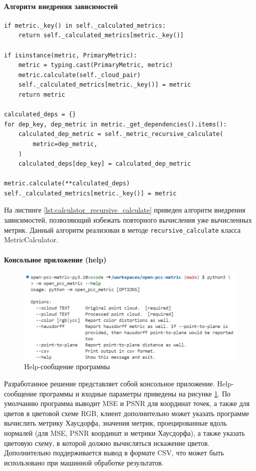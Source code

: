 \documentclass[a4paper,12pt]{extreport}
\begin{document}
\paragraph{Алгоритм внедрения зависимостей}

\begin{lstlisting}[caption={
    Алгоритм подсчёта метрик.
}, label={lst:calculator_recursive_calculate}]
if metric._key() in self._calculated_metrics:
    return self._calculated_metrics[metric._key()]

if isinstance(metric, PrimaryMetric):
    metric = typing.cast(PrimaryMetric, metric)
    metric.calculate(self._cloud_pair)
    self._calculated_metrics[metric._key()] = metric
    return metric

calculated_deps = {}
for dep_key, dep_metric in metric._get_dependencies().items():
    calculated_dep_metric = self._metric_recursive_calculate(
        metric=dep_metric,
    )
    calculated_deps[dep_key] = calculated_dep_metric

metric.calculate(**calculated_deps)
self._calculated_metrics[metric._key()] = metric
\end{lstlisting}

На листинге \ref{lst:calculator_recursive_calculate} приведен алгоритм внедрения
зависимостей, позволяющий избежать повторного вычисления уже вычисленных метрик.
Данный алгоритм реализован в методе \texttt{recursive\_calculate} класса
MetricCalculator.

\paragraph{Консольное приложение (help)}

\begin{figure}[H]
    \centering
    \includegraphics[width=0.7\linewidth]{assets/open_pcc_metric_help.png}
    \caption{Help-сообщение программы}
    \label{img:pcc_metric_help}
\end{figure}

Разработанное решение представляет собой консольное приложение. Help-сообщение
программы и входные параметры приведены на рисунке \ref{img:pcc_metric_help}. По
умолчанию программа выводит MSE и PSNR для координат точек, а также для цветов в
цветовой схеме RGB, клиент дополнительно может указать программе вычислить
метрику Хаусдорфа, значения метрик, проецированные вдоль нормалей (для MSE, PSNR
координат и метрики Хаусдорфа), а также указать цветовую схему, в которой должно
вычисляться искажение цветов. Дополнительно поддерживается вывод в формате CSV,
что может быть использовано при машинной обработке результатов.
\end{document}
